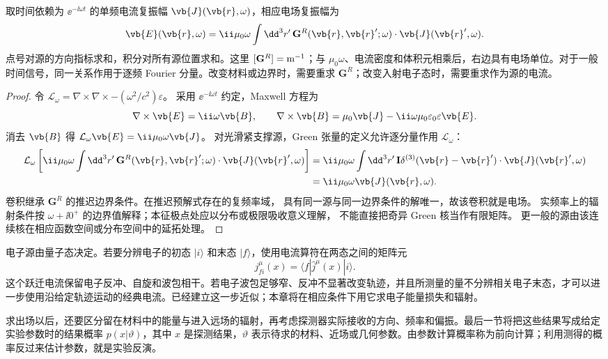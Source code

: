 \begin{proposition}[源到场的线性映射]
取时间依赖为 $\ee^{-\ii\omega t}$ 的单频电流复振幅 $\vb{J}(\vb{r},\omega)$，相应电场复振幅为
\begin{equation}
{
\vb{E}(\vb{r},\omega)
=\ii\mu_0\omega\int\dd^3r'\,
\mathbf G^R(\vb{r},\vb{r}';\omega)\cdot
\vb{J}(\vb{r}',\omega).}
\label{eq:green_tensor_source_to_field_dp123}
\end{equation}
点号对源的方向指标求和，积分对所有源位置求和。这里 $[\mathbf G^R]={\rm m^{-1}}$；与 $\mu_0\omega$、电流密度和体积元相乘后，右边具有电场单位。对于一般时间信号，同一关系作用于逐频 Fourier 分量。改变材料或边界时，需要重求 $\mathbf G^R$；改变入射电子态时，需要重求作为源的电流。
\end{proposition}
\begin{proof}
令 $\mathcal L_\omega=\nabla\times\nabla\times-(\omega^2/c^2)\varepsilon$。
采用 $\ee^{-\ii\omega t}$ 约定，Maxwell 方程为
\[
 \nabla\times\vb{E}=\ii\omega\vb{B},
 \qquad
 \nabla\times\vb{B}=\mu_0\vb{J}-\ii\omega\mu_0\varepsilon_0\varepsilon\vb{E}.
\]
消去 $\vb{B}$ 得 $\mathcal L_\omega\vb{E}=\ii\mu_0\omega\vb{J}$。
对光滑紧支撑源，Green 张量的定义允许逐分量作用 $\mathcal L_\omega$：
\begin{align*}
 \mathcal L_\omega\left[\ii\mu_0\omega\int\dd^3r'\,
 \mathbf G^R(\vb{r},\vb{r}';\omega)\cdot\vb{J}(\vb{r}',\omega)\right]
 &=\ii\mu_0\omega\int\dd^3r'\,
 \mathbf I\delta^{(3)}(\vb{r}-\vb{r}')\cdot\vb{J}(\vb{r}',\omega)\\
 &=\ii\mu_0\omega\vb{J}(\vb{r},\omega).
\end{align*}
卷积继承 $\mathbf G^R$ 的推迟边界条件。在推迟预解式存在的复频率域，
具有同一源与同一边界条件的解唯一，故该卷积就是电场。
实频率上的辐射条件按 $\omega+\ii0^+$ 的边界值解释；本征极点处应以分布或极限吸收意义理解，
不能直接把奇异 Green 核当作有限矩阵。
更一般的源由该连续核在相应函数空间或分布空间中的延拓处理。
\end{proof}


电子源由量子态决定。若要分辨电子的初态 $|i\rangle$ 和末态 $|f\rangle$，使用电流算符在两态之间的矩阵元
\[
j^\mu_{fi}(x)=\langle f|\hat j^\mu(x)|i\rangle.
\]
这个跃迁电流保留电子反冲、自旋和波包相干。若电子波包足够窄、反冲不显著改变轨迹，并且所测量的量不分辨相关电子末态，才可以进一步使用沿给定轨迹运动的经典电流。已经建立这一步近似；本章将在相应条件下用它求电子能量损失和辐射。\cite{GarciaDeAbajo2010RMP,GarciaDeAbajoDiGiulio2021,RoquesCarmes2023APR}

求出场以后，还要区分留在材料中的能量与进入远场的辐射，再考虑探测器实际接收的方向、频率和偏振。最后一节将把这些结果写成给定实验参数时的结果概率 $p(x|\vartheta)$，其中 $x$ 是探测结果，$\vartheta$ 表示待求的材料、近场或几何参数。由参数计算概率称为前向计算；利用测得的概率反过来估计参数，就是实验反演。


